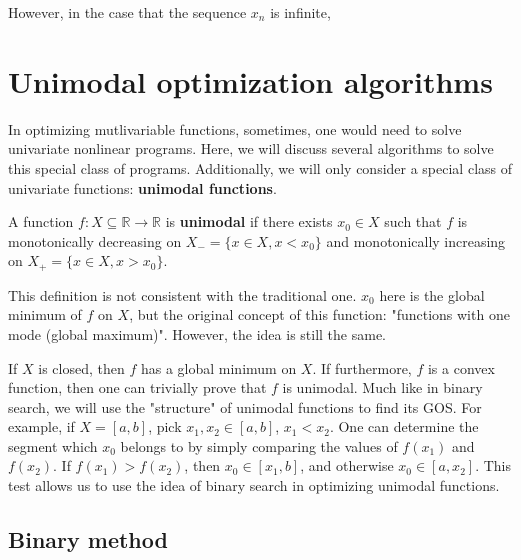 However, in the case that the sequence \( x_{n} \) is infinite, 



\section{Unimodal optimization algorithms} %
\label{sec:Single-variable algorithms}

In optimizing mutlivariable functions, sometimes, one would need to solve
univariate nonlinear programs. Here, we will discuss several algorithms to solve
this special class of programs. Additionally, we will only consider a special
class of univariate functions: \textbf{unimodal functions}.

\begin{definition}
\label{def:Unimodal function}
  A function \( f: X \subseteq \mathbb{R} \to  \mathbb{R} \) is
  \textbf{unimodal} if there exists \( x_{0} \in X \) such that \( f \) is
  monotonically decreasing on \( X_{-} = \{x \in X, x < x_{0}\}   \) and
  monotonically increasing on \( X_{+} = \{x \in X, x > x_{0}\}   \).
\end{definition}

This definition is not consistent with the traditional one. \( x_{0} \) here is
the global minimum of \( f \) on \( X \), but the original concept of this
function: "functions with one mode (global maximum)". However, the idea is still
the same.

If \( X \) is closed, then \( f \) has a global minimum on \( X \). If
furthermore, \( f \) is a convex function, then one can trivially prove that \(
f\) is unimodal. Much like in binary search, we will use the "structure" of
unimodal functions to find its GOS. For example, if \( X = [a, b] \), pick \(
x_{1}, x_{2} \in [a, b] \), \( x_{1} < x_{2} \). One can determine the segment
which \( x_{0} \) belongs to by simply comparing the values of
\( f(x_{1}) \) and \( f(x_{2}) \). If \( f(x_{1}) > f(x_{2}) \), then \( x_{0}
\in [x_{1}, b] \), and otherwise \( x_{0} \in [a, x_{2}] \). This test allows us
to use the idea of binary search in optimizing unimodal functions.

\subsection{Binary method} %
\label{sub:Binary method}

